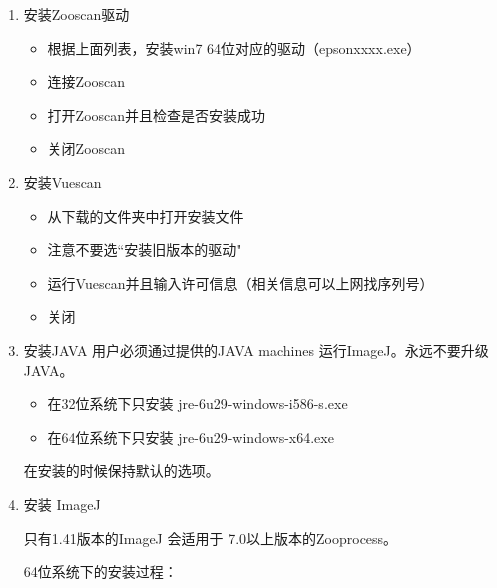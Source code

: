 		\begin{enumerate}
			\item 安装Zooscan驱动
				\begin{itemize}
					\item 根据上面列表，安装win7 64位对应的驱动（epsonxxxx.exe）
					\item 连接Zooscan
					\item 打开Zooscan并且检查是否安装成功
					\item 关闭Zooscan
				\end{itemize}
			\item 安装Vuescan
				\begin{itemize}
					\item 从下载的文件夹中打开安装文件
					\item 注意不要选“安装旧版本的驱动"
					\item 运行Vuescan并且输入许可信息（相关信息可以上网找序列号）
					\item	关闭
				\end{itemize}
			\item 安装JAVA
				用户必须通过提供的JAVA machines 运行ImageJ。永远不要升级JAVA。
				\begin{itemize}
					\item 在32位系统下只安装 jre-6u29-windows-i586-s.exe												\item 在64位系统下只安装 jre-6u29-windows-x64.exe
				\end{itemize}
				在安装的时候保持默认的选项。
			\item 安装 ImageJ
				
				只有1.41版本的ImageJ 会适用于 7.0以上版本的Zooprocess。
				
				64位系统下的安装过程：
				

\end{enumerate}
